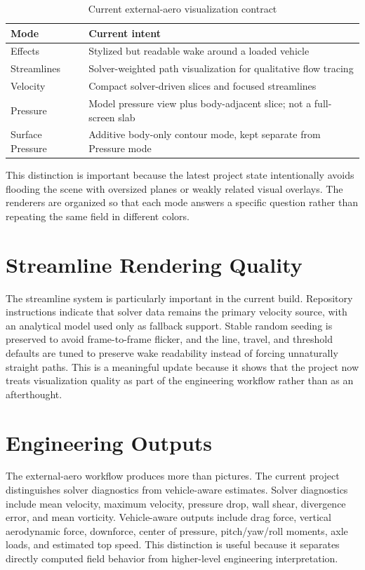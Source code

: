 \documentclass[12pt,a4paper,titlepage]{report}
\begin{document}
\begin{table}[H]
\centering
\caption{Current external-aero visualization contract}
\label{tab:vizcontract}
\begin{tabular}{p{3.0cm}p{8.8cm}}
\toprule
\textbf{Mode} & \textbf{Current intent} \\
\midrule
Effects & Stylized but readable wake around a loaded vehicle \\
Streamlines & Solver-weighted path visualization for qualitative flow tracing \\
Velocity & Compact solver-driven slices and focused streamlines \\
Pressure & Model pressure view plus body-adjacent slice; not a full-screen slab \\
Surface Pressure & Additive body-only contour mode, kept separate from Pressure mode \\
\bottomrule
\end{tabular}
\end{table}

This distinction is important because the latest project state intentionally avoids flooding the scene with oversized planes or weakly related visual overlays. The renderers are organized so that each mode answers a specific question rather than repeating the same field in different colors.

\section{Streamline Rendering Quality}
The streamline system is particularly important in the current build. Repository instructions indicate that solver data remains the primary velocity source, with an analytical model used only as fallback support. Stable random seeding is preserved to avoid frame-to-frame flicker, and the line, travel, and threshold defaults are tuned to preserve wake readability instead of forcing unnaturally straight paths. This is a meaningful update because it shows that the project now treats visualization quality as part of the engineering workflow rather than as an afterthought.

\section{Engineering Outputs}
The external-aero workflow produces more than pictures. The current project distinguishes solver diagnostics from vehicle-aware estimates. Solver diagnostics include mean velocity, maximum velocity, pressure drop, wall shear, divergence error, and mean vorticity. Vehicle-aware outputs include drag force, vertical aerodynamic force, downforce, center of pressure, pitch/yaw/roll moments, axle loads, and estimated top speed. This distinction is useful because it separates directly computed field behavior from higher-level engineering interpretation.
\end{document}
